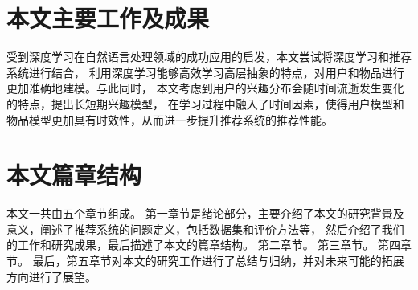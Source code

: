 \section{本文主要工作及成果}
受到深度学习在自然语言处理领域的成功应用的启发，本文尝试将深度学习和推荐系统进行结合，
利用深度学习能够高效学习高层抽象的特点，对用户和物品进行更加准确地建模。与此同时，
本文考虑到用户的兴趣分布会随时间流逝发生变化的特点，提出长短期兴趣模型，
在学习过程中融入了时间因素，使得用户模型和物品模型更加具有时效性，从而进一步提升推荐系统的推荐性能。

\section{本文篇章结构}
本文一共由五个章节组成。
第一章节是绪论部分，主要介绍了本文的研究背景及意义，阐述了推荐系统的问题定义，包括数据集和评价方法等，
然后介绍了我们的工作和研究成果，最后描述了本文的篇章结构。
第二章节。
第三章节。
第四章节。
最后，第五章节对本文的研究工作进行了总结与归纳，并对未来可能的拓展方向进行了展望。



